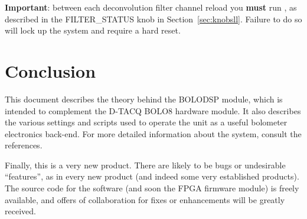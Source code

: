 \documentclass[12pt,a4paper]{article}
\begin{document}
\textbf{Important}: between each deconvolution filter channel reload you \textbf{must} run \mbox{}, as described in
the FILTER{\_}STATUS knob in Section~\ref{sec:knobsll}. Failure to do so will lock up the system and require a hard reset.

\section{Conclusion}
This document describes the theory behind the BOLODSP module, which is intended to complement the D-TACQ BOLO8 hardware module. It also describes the
various settings and scripts used to operate the unit as a useful bolometer electronics back-end. For more detailed information about the system, consult
the references.

Finally, this is a very new product. There are likely to be bugs or undesirable ``features'', as in every new product (and indeed some very established
products). The source code for the software (and soon the FPGA firmware module) is freely available, and offers of collaboration for fixes or enhancements
will be greatly received.



\end{document}

